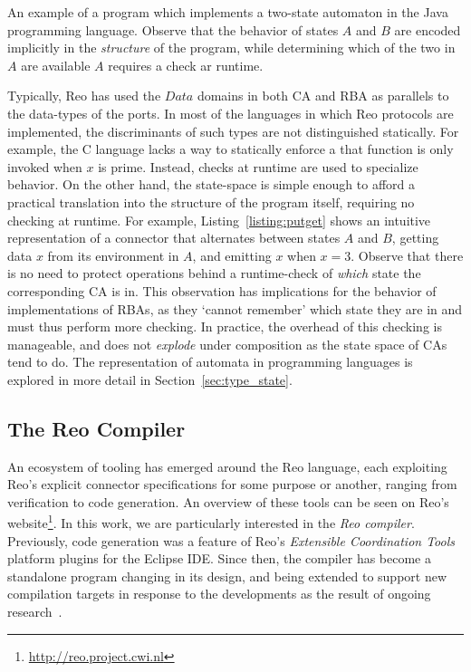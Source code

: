 \begin{listing}[ht]
	\inputminted[]{java}{putget.java}
	\caption[Type state automaton in Java.]{An example of a program which implements a two-state automaton in the Java programming language. Observe that the behavior of states $A$ and $B$ are encoded implicitly in the \textit{structure} of the program, while determining which of the two in $A$ are available $A$ requires a check ar runtime.}
	\label{listing:putget}
\end{listing}
Typically, Reo has used the $Data$ domains in both CA and RBA as parallels to the data-types of the ports. In most of the languages in which Reo protocols are implemented, the discriminants of such types are not distinguished statically. For example, the C language lacks a way to statically enforce a that function  is only invoked when $x$ is prime. Instead, checks at runtime are used to specialize behavior. On the other hand, the state-space is simple enough to afford a practical translation into the structure of the program itself, requiring no checking at runtime. For example, Listing~\ref{listing:putget} shows an intuitive representation of a connector that alternates between states $A$ and $B$, getting data $x$ from its environment in $A$, and emitting $x$ when $x=3$. Observe that there is no need to protect operations behind a runtime-check of \textit{which} state the corresponding CA is in. This observation has implications for the behavior of implementations of RBAs, as they `cannot remember' which state they are in and must thus perform more checking. In practice, the overhead of this checking is manageable, and does not \textit{explode} under composition as the state space of CAs tend to do. The representation of automata in programming languages is explored in more detail in Section~\ref{sec:type_state}.

\subsection{The Reo Compiler}
An ecosystem of tooling has emerged around the Reo language, each exploiting Reo's explicit connector specifications for some purpose or another, ranging from verification to code generation. An overview of these tools can be seen on Reo's  website\footnote{\url{http://reo.project.cwi.nl}}. In this work, we are particularly interested in the \textit{Reo compiler}. Previously, code generation was a feature of Reo's \textit{Extensible Coordination Tools} platform plugins for the Eclipse IDE. Since then, the compiler has become a standalone program changing in its design, and being extended to support new compilation targets in response to the developments as the result of ongoing research~\cite{jongmans2012automatic, jongmans2015partially, dokter2018rule}.

